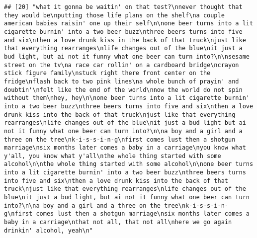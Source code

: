 \documentclass[]{article}
\begin{document}
\begin{verbatim}
## [20] "what it gonna be waitin' on that test?\nnever thought that they would be\nputting those life plans on the shelf\na couple american babies raisin' one up their self\n\none beer turns into a lit cigarette burnin' into a two beer buzz\nthree beers turns into five and six\nthen a love drunk kiss in the back of that truck\njust like that everything rearranges\nlife changes out of the blue\nit just a bud light, but ai not it funny what one beer can turn into?\n\nsesame street on the tv\na race car rollin' on a cardboard bridge\ncrayon stick figure family\nstuck right there front center on the fridge\nflash back to two pink lines\na whole bunch of prayin' and doubtin'\nfelt like the end of the world\nnow the world do not spin without them\nhey, hey\n\none beer turns into a lit cigarette burnin' into a two beer buzz\nthree beers turns into five and six\nthen a love drunk kiss into the back of that truck\njust like that everything rearranges\nlife changes out of the blue\nit just a bud light but ai not it funny what one beer can turn into?\n\na boy and a girl and a three on the tree\nk-i-s-s-i-n-g\nfirst comes lust then a shotgun marriage\nsix months later comes a baby in a carriage\nyou know what y'all, you know what y'all\nthe whole thing started with some alcohol\n\nthe whole thing started with some alcohol\n\none beer turns into a lit cigarette burnin' into a two beer buzz\nthree beers turns into five and six\nthen a love drunk kiss into the back of that truck\njust like that everything rearranges\nlife changes out of the blue\nit just a bud light, but ai not it funny what one beer can turn into?\n\na boy and a girl and a three on the tree\nk-i-s-s-i-n-g\nfirst comes lust then a shotgun marriage\nsix months later comes a baby in a carriage\nthat not all, that not all\nhere we go again drinkin' alcohol, yeah\n"                                                                                                                                                                                                                                                                                                                                                                                                                                                                                                                                                                                                                                                                                                                                                                                                                                                                                                                                                                                                                                                                      

\end{verbatim}
\end{document}
